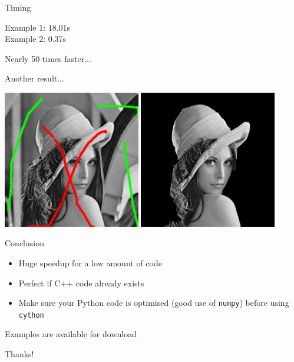 \documentclass[12pt]{beamer}
\begin{document}
\begin{frame}{Timing}

\begin{center}
\begin{minipage}{0.4\textwidth}
Example 1: 18.01s\\
Example 2: 0.37s

\vspace{0.05\textheight}

Nearly 50 times faster...
\end{minipage}
\end{center}
\end{frame}

\begin{frame}{Another result...}

\begin{center}
\includegraphics[width=0.45\textwidth]{initialisation2.png}
\hspace{0.04\textwidth}
\includegraphics[width=0.45\textwidth]{demo/graphcut2/segmentation2.png}
\end{center}

\end{frame}

\begin{frame}{Conclusion}

\begin{itemize}
\item Huge speedup for a low amount of code
\item Perfect if C++ code already exists
\item Make sure your Python code is optimised (good use of \texttt{numpy})
  before using \texttt{cython}  
\end{itemize}

\vspace{0.05\textheight}

\begin{center}
\large
Examples are available for download
\end{center}
\end{frame}


\begin{frame}
\begin{center}
\LARGE
\textcolor{specialblue}{Thanks!}
\end{center}
\end{frame}
\end{document}
